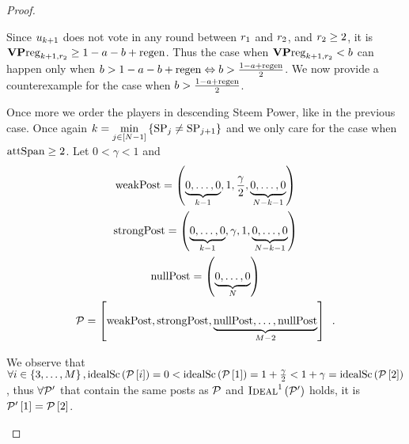 \begin{proof}
\begin{itemize}
    Since $u_{k+1}$ does not vote in any round between $r_1$ and
    $r_2$, and $r_2 \geq 2$, it is $\mathrm{\textbf{VP}reg}_{k+1, r_2} \geq 1 -
    a - b + \mathrm{regen}$. Thus the case when $\mathrm{\textbf{VP}reg}_{k+1, r_2} < b$ can
    happen only when $b > 1 - a - b + \mathrm{regen} \Leftrightarrow b > \frac{1 - a +
    \mathrm{regen}}{2}$. We now provide a counterexample for the case when $b > \frac{1
    - a + \mathrm{regen}}{2}$.

    Once more we order the players in descending Steem Power, like in the
    previous case. Once again $k = \min\limits_{j \in \left[N -
    1\right]}\left\{\mathrm{SP}_j \neq \mathrm{SP}_{j+1}\right\}$ and we only care for the
    case when $\mathrm{attSpan} \geq 2$. Let $0 < \gamma < 1$ and
    \begin{gather*}
      \mathrm{weakPost} = \left(\underbrace{0, \dots, 0}_{k - 1}, 1, \frac{\gamma}{2},
      \underbrace{0, \dots, 0}_{N - k - 1}\right) \\
      \mathrm{strongPost} = \left(\underbrace{0, \dots, 0}_{k - 1}, \gamma, 1,
      \underbrace{0, \dots, 0}_{N - k - 1}\right) \\
      \mathrm{nullPost} = \left(\underbrace{0, \dots, 0}_{N}\right) \\
      \mathcal{P} = \left[\mathrm{weakPost}, \mathrm{strongPost}, \underbrace{\mathrm{nullPost}, \dots,
      \mathrm{nullPost}}_{M - 2}\right] \enspace.
    \end{gather*}

    We observe that $\forall i \in \left\{3, \dots, M\right\},
    \mathrm{idealSc}\left(\mathcal{P}\left[i\right]\right) = 0 < \mathrm{idealSc}\left(\mathcal{P}\left[1\right]\right) = 1 +
    \frac{\gamma}{2} < 1 + \gamma = \mathrm{idealSc}\left(\mathcal{P}\left[2\right]\right)$, thus
    $\forall \mathcal{P}'$ that contain the same posts as $\mathcal{P}$ and
    $\textsc{Ideal}^1\left(\mathcal{P}'\right)$ holds, it is
    $\mathcal{P}'\left[1\right] = \mathcal{P}\left[2\right]$.


\end{itemize}
\end{proof}
